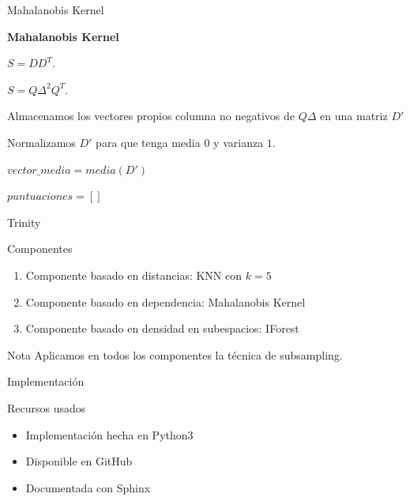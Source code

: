 \documentclass[10pt]{beamer}
\begin{document}
\begin{frame}[fragile]{Mahalanobis Kernel}
\vspace{10px}
\pause
{}

\begin{algorithm}[H]{\textbf{Mahalanobis Kernel}}
	
	$S = DD^T$.
	
	$S = Q\Delta^2 Q^T$.
	
	Almacenamos los vectores propios columna no negativos de $Q\Delta$ en una matriz $D'$
	
	Normalizamos $D'$ para que tenga media $0$ y varianza $1$.
	
	$vector\_media = media(D')$
	
	$puntuaciones = []$
	
\end{algorithm}

\end{frame}

\begin{frame}[fragile]{Trinity}
\vspace{10px}
\pause
{}


\begin{block}{Componentes}
	\begin{enumerate}
		\item Componente basado en distancias: KNN con $k=5$
		\pause
		\item Componente basado en dependencia: Mahalanobis Kernel
		\pause
		\item Componente basado en densidad en subespacios: IForest
	\end{enumerate}
\end{block}

\begin{alertblock}{Nota}
	Aplicamos en todos los componentes la técnica de subsampling.
\end{alertblock}

\end{frame}

\begin{frame}[fragile]{Implementación}
\vspace{10px}
\pause
{}

\begin{block}{Recursos usados}
	\begin{itemize}
		\item Implementación hecha en Python3
		\pause
		\item Disponible en GitHub
		\pause
		\item Documentada con Sphinx
	\end{itemize}
\end{block}

\end{frame}
\end{document}
